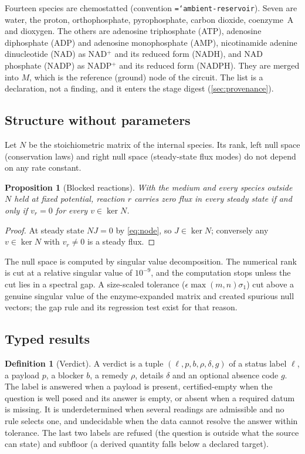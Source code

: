 \documentclass[5p]{elsarticle}
\theoremstyle{definition}
\newtheorem{definition}{Definition}
\theoremstyle{plain}
\newtheorem{proposition}{Proposition}
\newcommand{\st}[1]{\textsf{#1}}            %
\newcommand{\breakingtt}[1]{\texttt{\hyphenchar\font=`\-\relax #1}}  %
\newcommand{\conv}[1]{\breakingtt{#1}}      %
\begin{document}
Fourteen species are chemostatted (convention \conv{ambient-reservoir}).
Seven are water, the proton, orthophosphate, pyrophosphate, carbon dioxide, coenzyme~A and dioxygen.
The others are adenosine triphosphate (ATP), adenosine diphosphate (ADP) and adenosine monophosphate (AMP), nicotinamide adenine dinucleotide (NAD) as NAD$^+$ and its reduced form (NADH), and NAD phosphate (NADP) as NADP$^+$ and its reduced form (NADPH).
They are merged into $M$, which is the reference (ground) node of the circuit.
The list is a declaration, not a finding, and it enters the stage digest (\cref{sec:provenance}).

\subsection{Structure without parameters}
\label{sec:structure}

Let $N$ be the stoichiometric matrix of the internal species.
Its rank, left null space (conservation laws) and right null space (steady-state flux modes) do not depend on any rate constant.

\begin{proposition}[Blocked reactions]
\label{prop:blocked}
With the medium and every species outside $N$ held at fixed potential, reaction $r$ carries zero flux in every steady state if and only if $v_r=0$ for every $v\in\ker N$.
\end{proposition}
\begin{proof}
At steady state $NJ=0$ by \cref{eq:node}, so $J\in\ker N$; conversely any $v\in\ker N$ with $v_r\ne0$ is a steady flux.
\end{proof}

The null space is computed by singular value decomposition.
The numerical rank is cut at a relative singular value of $10^{-9}$, and the computation stops unless the cut lies in a spectral gap.
A size-scaled tolerance ($\epsilon\max(m,n)\sigma_1$) cut above a genuine singular value of the enzyme-expanded matrix and created spurious null vectors; the gap rule and its regression test exist for that reason.

\subsection{Typed results}
\label{sec:verdicts}

\begin{definition}[Verdict]
\label{def:verdict}
A verdict is a tuple $(\ell,p,b,\rho,\delta,g)$ of a status label $\ell$, a payload $p$, a blocker $b$, a remedy $\rho$, details $\delta$ and an optional absence code $g$.
The label is \st{answered} when a payload is present, \st{certified-empty} when the question is well posed and its answer is empty, or \st{absent} when a required datum is missing.
It is \st{underdetermined} when several readings are admissible and no rule selects one, and \st{undecidable} when the data cannot resolve the answer within tolerance.
The last two labels are \st{refused} (the question is outside what the source can state) and \st{subfloor} (a derived quantity falls below a declared target).
\end{definition}
\end{document}
